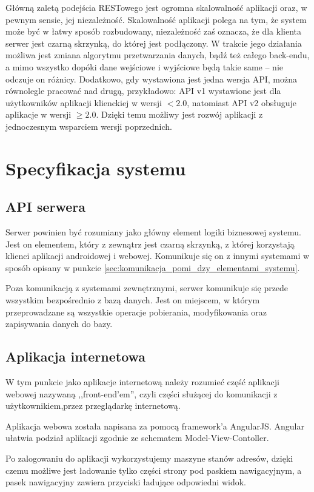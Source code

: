\documentclass[eng,oneside]{mgr}
\begin{document}
Główną zaletą podejścia RESTowego jest ogromna skalowalność aplikacji oraz, w pewnym sensie, jej niezależność. Skalowalność aplikacji polega na tym, że system może być w łatwy sposób rozbudowany, niezależność zaś oznacza, że dla klienta serwer jest czarną skrzynką, do której jest podłączony. W trakcie jego działania możliwa jest zmiana algorytmu przetwarzania danych, bądź też całego back-endu, a mimo wszystko dopóki dane wejściowe i wyjściowe będą takie same – nie odczuje on różnicy. Dodatkowo, gdy wystawiona jest jedna wersja API, można równolegle pracować nad drugą, przykładowo: API v1 wystawione jest dla użytkowników aplikacji klienckiej w wersji $<2.0$, natomiast API v2 obsługuje aplikacje w wersji $\ge2.0$. Dzięki temu możliwy jest rozwój aplikacji z jednoczesnym wsparciem wersji poprzednich. 

\chapter{Specyfikacja systemu}
\section{API serwera}
Serwer powinien być rozumiany jako główny element logiki biznesowej systemu. Jest on elementem, który z zewnątrz jest czarną skrzynką, z której korzystają klienci aplikacji androidowej i webowej. Komunikuje się on z innymi systemami w sposób opisany w punkcie \ref{sec:komunikacja_pomi_dzy_elementami_systemu}.

Poza komunikacją z systemami zewnętrznymi, serwer komunikuje się przede wszystkim bezpośrednio z bazą danych. Jest on miejscem, w którym przeprowadzane są wszystkie operacje pobierania, modyfikowania oraz zapisywania danych do bazy.

\section{Aplikacja internetowa}
W tym punkcie jako aplikacje internetową należy rozumieć część aplikacji webowej nazywaną ,,front-end’em'', czyli części służącej do komunikacji z użytkownikiem,przez przeglądarkę internetową.

Aplikacja webowa została napisana za pomocą framework’a AngularJS. Angular ułatwia podział aplikacji zgodnie ze schematem Model-View-Contoller.

Po zalogowaniu do aplikacji wykorzystujemy maszyne stanów adresów, dzięki czemu możliwe jest ładowanie tylko części strony pod paskiem nawigacyjnym, a pasek nawigacyjny zawiera przyciski ładujące odpowiedni widok.
\end{document}
